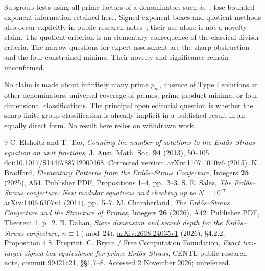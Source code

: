 \documentclass[11pt,a4paper]{article}
\theoremstyle{definition}\newtheorem{definition}[theorem]{Definition}
\begin{document}
Subgroup tests using all prime factors of a denominator, such as~\cite[Proposition 4.8]{Dahan}, lose bounded exponent information retained here. Signed exponent boxes and quotient methods also occur explicitly in public research notes~\cite{Bryan}; their use alone is not a novelty claim. The quotient criterion is an elementary consequence of the classical divisor criteria. The narrow questions for expert assessment are the sharp obstruction and the four constrained minima. Their novelty and significance remain unconfirmed.

No claim is made about infinitely many prime $p_m$, absence of Type I solutions at other denominators, universal coverage of primes, prime-product minima, or four-dimensional classifications. The principal open editorial question is whether the sharp finite-group classification is already implicit in a published result in an equally direct form. No result here relies on withdrawn work.

\begin{thebibliography}{9}\small
{} C. Elsholtz and T. Tao, \emph{Counting the number of solutions to the Erd\H{o}s--Straus equation on unit fractions}, J. Aust. Math. Soc. \textbf{94} (2013), 50--105. \href{https://doi.org/10.1017/S1446788712000468}{doi:10.1017/S1446788712000468}. Corrected version: \href{https://arxiv.org/abs/1107.1010v6}{arXiv:1107.1010v6} (2015).
 K. Bradford, \emph{Elementary Patterns from the Erd\H{o}s--Straus Conjecture}, Integers \textbf{25} (2025), A54. \href{https://math.colgate.edu/~integers/z54/z54.pdf}{Publisher PDF}, Propositions 1--4, pp.~2--3.
 S. E. Salez, \emph{The Erd\H{o}s--Straus conjecture: New modular equations and checking up to $N=10^{17}$}, \href{https://arxiv.org/abs/1406.6307v1}{arXiv:1406.6307v1} (2014), pp.~5--7.
 M. Chamberland, \emph{The Erd\H{o}s--Straus Conjecture and the Structure of Primes}, Integers \textbf{26} (2026), A42. \href{https://math.colgate.edu/~integers/aa42/aa42.pdf}{Publisher PDF}, Theorem 1, p.~2.
 B. Dahan, \emph{Sieve dimension and search depth for the Erd\H{o}s--Straus conjecture, $n\equiv1\pmod{24}$}, \href{https://arxiv.org/abs/2608.24035v1}{arXiv:2608.24035v1} (2026), \S4.2.2, Proposition 4.8. Preprint.
 C. Bryan / Free Computation Foundation, \emph{Exact two-target signed-box equivalence for prime Erd\H{o}s--Straus}, CENTL public research note, \href{https://github.com/nightwarelabz/centl/blob/99421c21ece090737f2028f3af8e5813ed7efa2c/research/erdos-straus/ES-TWO-TARGET-SIGNED-BOX-EQUIVALENCE.md}{commit 99421c21}, \S\S1,7--8. Accessed 2 November 2026; unrefereed.
\end{thebibliography}
\end{document}

